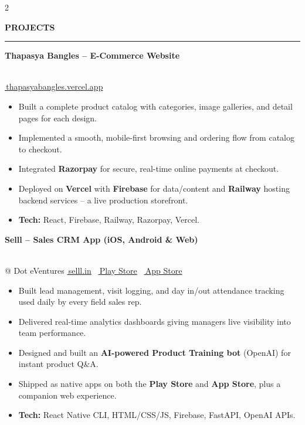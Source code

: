 \documentclass[10pt, a4paper]{article}
\newcommand{\rsection}[1]{%
  \vspace{4pt}%
  {\color{accent}\textbf{\small\MakeUppercase{#1}}}\\[-5pt]%
  {\color{rulecol}\rule{\linewidth}{0.8pt}}%
  \vspace{2.5pt}%
}
\newcommand{\pentry}[3]{%
  \noindent
  \begin{minipage}[t]{0.70\linewidth}
    {\small\textbf{\color{accent}#1}}
  \end{minipage}\hfill%
  \begin{minipage}[t]{0.28\linewidth}
    \raggedleft{\footnotesize\color{mutedtext}#2}
  \end{minipage}\\[1pt]%
  {\footnotesize\color{mutedtext}#3}%
  \vspace{1pt}%
}
\begin{document}
\begin{paracol}{2}
\switchcolumn

\rsection{Projects}
\fontsize{7.6}{9.1}\selectfont

\pentry{Thapasya Bangles -- E-Commerce Website}{2026}{\href{https://thapasyabangles.vercel.app}{\faLink\,thapasyabangles.vercel.app}}
\begin{itemize}
  \item Built a complete product catalog with categories, image galleries, and detail pages for each design.
  \item Implemented a smooth, mobile-first browsing and ordering flow from catalog to checkout.
  \item Integrated \textbf{Razorpay} for secure, real-time online payments at checkout.
  \item Deployed on \textbf{Vercel} with \textbf{Firebase} for data/content and \textbf{Railway} hosting backend services -- a live production storefront.
  \item \textbf{Tech:} React, Firebase, Railway, Razorpay, Vercel.
\end{itemize}

\vspace{2pt}
\pentry{Selll -- Sales CRM App (iOS, Android \& Web)}{Jun -- Sept 2025}{@ Dot eVentures \quad
  \href{https://selll.in}{\faLink\,selll.in} \textbar\
  \href{https://play.google.com/store/apps/details?id=com.classesssalescrm}{\faAndroid\,Play Store} \textbar\
  \href{https://apps.apple.com/in/app/selll/id6752857425}{\faApple\,App Store}}
\begin{itemize}
  \item Built lead management, visit logging, and day in/out attendance tracking used daily by every field sales rep.
  \item Delivered real-time analytics dashboards giving managers live visibility into team performance.
  \item Designed and built an \textbf{AI-powered Product Training bot} (OpenAI) for instant product Q\&A.
  \item Shipped as native apps on both the \textbf{Play Store} and \textbf{App Store}, plus a companion web experience.
  \item \textbf{Tech:} React Native CLI, HTML/CSS/JS, Firebase, FastAPI, OpenAI APIs.
\end{itemize}


\end{paracol}
\end{document}
